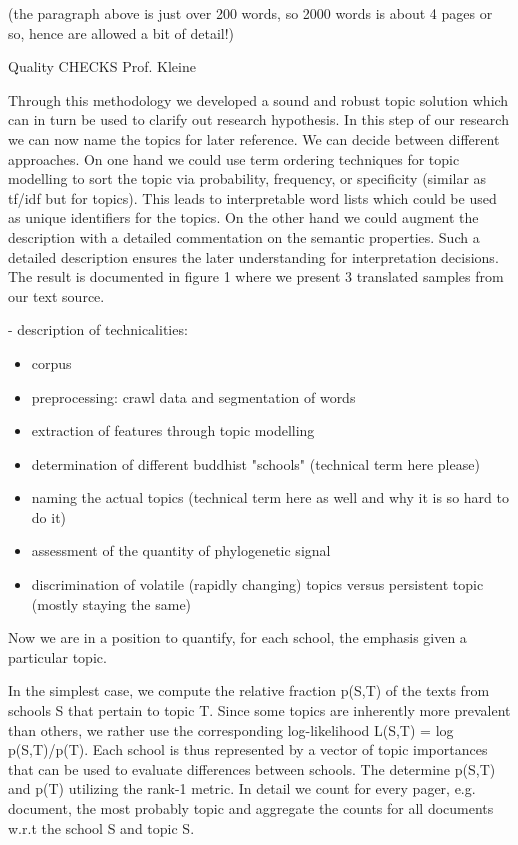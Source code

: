 \documentclass[a4paper,10pt]{article}
\newcommand{\TODO}[1]{\begingroup\color{red}#1\endgroup}
\begin{document}
  \TODO{(the paragraph above is just over 200 words, so 2000 words is about
    4 pages or so, hence are allowed a bit of detail!)}







Quality CHECKS Prof. Kleine

Through this methodology we developed a sound and robust topic solution which can in turn
be used to clarify out research hypothesis. In this step of our research we can now name
the topics for later reference. We can decide between different approaches. On one hand 
we could use term ordering techniques for topic modelling to sort the topic via 
probability, frequency, or specificity (similar as tf/idf but for topics). This leads to 
interpretable word lists which could be used as unique identifiers for the topics. On
the other hand we could augment the description with a detailed commentation on the 
semantic properties. Such a detailed description ensures the later understanding for 
interpretation decisions. The result is documented in figure 1 where we present 3 
translated samples from our text source.

- description of technicalities:
\begin{itemize}
 \item corpus
 \item preprocessing: crawl data and segmentation of words
 \item extraction of features through topic modelling
 \item determination of different buddhist "schools" (technical term here please)
 \item naming the actual topics (technical term here as well and why it is so hard to do it)
 \item assessment of the quantity of phylogenetic signal
 \item discrimination of volatile (rapidly changing) topics versus persistent topic 
  (mostly staying the same) 
\end{itemize}


Now we are in a position to quantify, for each school, the emphasis given a particular 
topic. 


In the simplest case, we compute the relative fraction p(S,T) of the texts from schools S 
that pertain to topic T. Since some topics are inherently more prevalent than others, we 
rather use the corresponding log-likelihood L(S,T) = log p(S,T)/p(T). Each school is thus
represented by a vector of topic importances that can be used to evaluate differences 
between schools. The determine p(S,T) and p(T) utilizing the rank-1 metric. In detail we 
count for every pager, e.g. document, the most probably topic and aggregate the counts 
for all documents w.r.t the school S and topic S. 
\end{document}
